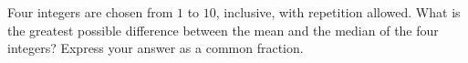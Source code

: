 Four integers are chosen from $1$ to $10$, inclusive, with repetition allowed. What is the greatest possible difference between the mean and the median of the four integers? Express your answer as a common fraction.
